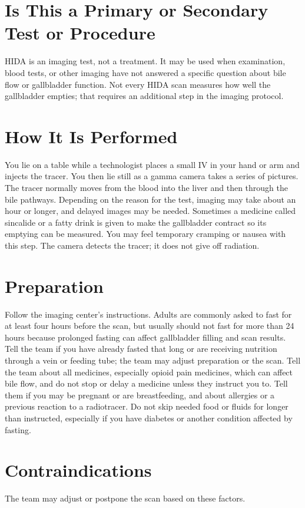 \section*{Is This a Primary or Secondary Test or Procedure}
HIDA is an imaging test, not a treatment. It may be used when examination, blood tests, or other imaging have not answered a specific question about bile flow or gallbladder function. Not every HIDA scan measures how well the gallbladder empties; that requires an additional step in the imaging protocol.

\section*{How It Is Performed}
You lie on a table while a technologist places a small IV in your hand or arm and injects the tracer. You then lie still as a gamma camera takes a series of pictures. The tracer normally moves from the blood into the liver and then through the bile pathways. Depending on the reason for the test, imaging may take about an hour or longer, and delayed images may be needed. Sometimes a medicine called sincalide or a fatty drink is given to make the gallbladder contract so its emptying can be measured. You may feel temporary cramping or nausea with this step. The camera detects the tracer; it does not give off radiation.

\section*{Preparation}
Follow the imaging center's instructions. Adults are commonly asked to fast for at least four hours before the scan, but usually should not fast for more than 24 hours because prolonged fasting can affect gallbladder filling and scan results. Tell the team if you have already fasted that long or are receiving nutrition through a vein or feeding tube; the team may adjust preparation or the scan. Tell the team about all medicines, especially opioid pain medicines, which can affect bile flow, and do not stop or delay a medicine unless they instruct you to. Tell them if you may be pregnant or are breastfeeding, and about allergies or a previous reaction to a radiotracer. Do not skip needed food or fluids for longer than instructed, especially if you have diabetes or another condition affected by fasting.

\section*{Contraindications}
The team may adjust or postpone the scan based on these factors.

